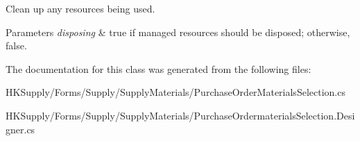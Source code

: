 Clean up any resources being used. 


\begin{DoxyParams}{Parameters}
{\em disposing} & true if managed resources should be disposed; otherwise, false.\\
\hline
\end{DoxyParams}


The documentation for this class was generated from the following files\+:\begin{DoxyCompactItemize}
\item 
H\+K\+Supply/\+Forms/\+Supply/\+Supply\+Materials/Purchase\+Order\+Materials\+Selection.\+cs\item 
H\+K\+Supply/\+Forms/\+Supply/\+Supply\+Materials/Purchase\+Ordermaterials\+Selection.\+Designer.\+cs\end{DoxyCompactItemize}
